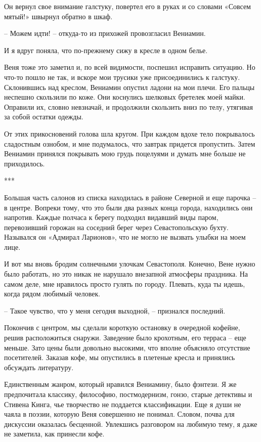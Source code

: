 \documentclass[
]{book}
\begin{document}
Он вернул свое внимание галстуку, повертел его в руках и со словами «Совсем мятый!» швырнул обратно в шкаф.

-- Можем идти! -- откуда-то из прихожей провозгласил Вениамин.

И я вдруг поняла, что по-прежнему сижу в кресле в одном белье.

Веня тоже это заметил и, по всей видимости, поспешил исправить ситуацию. Но что-то пошло не так, и вскоре мои трусики уже присоединились к галстуку. Склонившись над креслом, Вениамин опустил ладони на мои плечи. Его пальцы неспешно скользили по коже. Они коснулись шелковых бретелек моей майки. Оправили их, словно невзначай, и продолжили скользить вниз по телу, утягивая за собой остатки одежды.

От этих прикосновений голова шла кругом. При каждом вдохе тело покрывалось сладостным ознобом, и мне подумалось, что завтрак придется пропустить. Затем Вениамин принялся покрывать мою грудь поцелуями и думать мне больше не приходилось.

***

Большая часть салонов из списка находилась в районе Северной и еще парочка -- в центре. Вопреки тому, что это были два разных конца города, находились они напротив. Каждые полчаса к берегу подходил видавший виды паром, перевозивший горожан на соседний берег через Севастопольскую бухту. Назывался он «Адмирал Ларионов», что не могло не вызвать улыбки на моем лице.

И вот мы вновь бродим солнечными улочкам Севастополя. Конечно, Вене нужно было работать, но это никак не нарушало внезапной атмосферы праздника. На самом деле, мне нравилось просто гулять по городу. Плевать, куда ты идешь, когда рядом любимый человек.

-- Такое чувство, что у меня сегодня выходной, -- признался последний.

Покончив с центром, мы сделали короткую остановку в очередной кофейне, решив расположиться снаружи. Заведение было крохотным, его терраса -- еще меньше. Зато цены были довольно высокими, что вполне объясняло отсутствие посетителей. Заказав кофе, мы опустились в плетеные кресла и принялись обсуждать литературу.

Единственным жанром, который нравился Вениамину, было фэнтези. Я же предпочитала классику, философию, постмодернизм, гонзо, старые детективы и Стивена Кинга, чье творчество не поддается классификации. Еще я души не чаяла в поэзии, которую Веня совершенно не понимал. Словом, почва для дискуссии оказалась бесценной. Увлекшись разговором на любимую тему, я даже не заметила, как принесли кофе.
\end{document}
